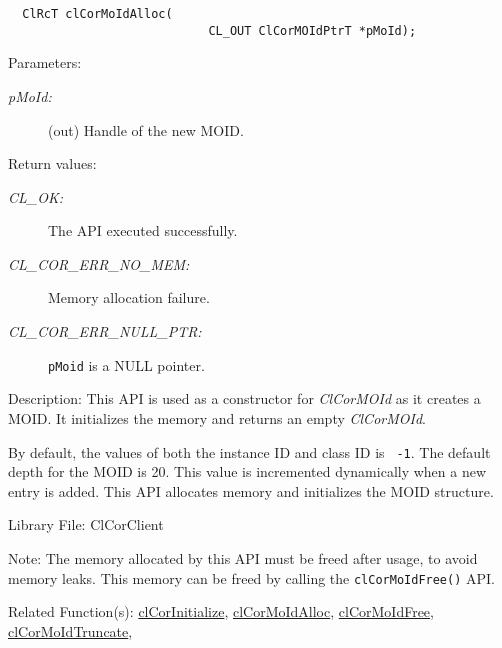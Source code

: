\begin{flushleft}
\begin{Desc}
\footnotesize\begin{verbatim}  ClRcT clCorMoIdAlloc(
             				CL_OUT ClCorMOIdPtrT *pMoId);
\end{verbatim}
\normalsize
\end{Desc}
\begin{Desc}
\item[Parameters:]
\begin{description}
\item[{\em p\-MoId:}](out) Handle of the new MOID.\end{description}
\end{Desc}
\begin{Desc}
\item[Return values:]
\begin{description}
\item[{\em CL\_\-OK:}]The API executed successfully. 
\item[{\em CL\_\-COR\_\-ERR\_\-NO\_\-MEM:}]Memory allocation failure. 
\item[{\em CL\_\-COR\_\-ERR\_\-NULL\_\-PTR:}]{\tt{pMoid}} is a NULL pointer.
\end{description}
\end{Desc}
\begin{Desc}
\item[Description:]This API is used as a constructor for \textit{ClCorMOId} as it creates a MOID. It initializes the memory and returns 
an empty \textit{ClCorMOId}. 
 \par
 By default, the values of both the instance ID and class ID is {\tt{ -1}}. The default depth for the MOID is 20. This value is incremented 
 dynamically when a new entry is added. This API allocates memory and initializes the MOID structure.\end{Desc}
\begin{Desc}
\item[Library File:]Cl\-Cor\-Client\end{Desc}
\begin{Desc}
\item[Note:]The memory allocated by this API must be freed after usage, to avoid memory leaks. This memory can be freed by calling the 
{\tt{cl\-Cor\-MoId\-Free()}} API.\end{Desc}
\begin{Desc}
\item[Related Function(s):]\hyperlink{pagecor228}{cl\-Cor\-Initialize}, \hyperlink{pagecor113}{cl\-Cor\-MoId\-Alloc}, 
\hyperlink{pagecor114}{cl\-Cor\-MoId\-Free},
\hyperlink{pagecor115}{cl\-Cor\-MoId\-Truncate}, 

\end{Desc}
\end{flushleft}
